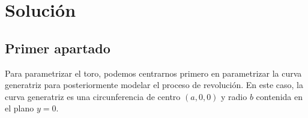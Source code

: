 \documentclass{article}
\begin{document}
\section{Solución}
\subsection{Primer apartado}
\hspace{1mm} Para parametrizar el toro, podemos centrarnos primero en parametrizar la curva
generatriz para posteriormente modelar el proceso de revolución. En este caso,
la curva generatriz es una circunferencia de centro $(a,0,0)$ y radio $b$
contenida en el plano $y = 0$.

\begin{center}
    
\end{center}
\end{document}
